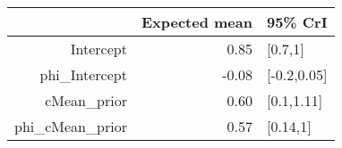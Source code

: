 \begin{tabular}{rrl}
  \hline
 & Expected mean & 95\% CrI \\ 
  \hline
Intercept & 0.85 & [0.7,1] \\ 
  phi\_Intercept & -0.08 & [-0.2,0.05] \\ 
  cMean\_prior & 0.60 & [0.1,1.11] \\ 
  phi\_cMean\_prior & 0.57 & [0.14,1] \\ 
   \hline
\end{tabular}

